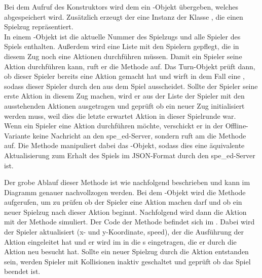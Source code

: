 Bei dem Aufruf des Konstruktors wird dem  ein -Objekt übergeben, welches abgespeichert
wird.
Zusätzlich erzeugt der  eine Instanz der Klasse , die einen Spielzug repräsentiert. \\

In einem -Objekt ist die aktuelle Nummer des Spielzugs und alle Spieler des Spiels enthalten.
Außerdem wird eine Liste mit den Spielern gepflegt, die in diesem Zug noch eine Aktionen durchführen müssen.
Damit ein Spieler seine Aktion durchführen kann, ruft er die Methode  auf.
Das Turn-Objekt prüft dann, ob dieser Spieler bereits eine Aktion gemacht hat und wirft in dem Fall eine
, sodass dieser Spieler durch den  aus dem Spiel ausscheidet.
Sollte der Spieler seine erste Aktion in diesem Zug machen, wird er aus der Liste der Spieler mit den ausstehenden
Aktionen ausgetragen und geprüft ob ein neuer Zug initialisiert werden muss, weil dies die letzte erwartet Aktion
in dieser Spielrunde war. \\

Wenn ein Spieler eine Aktion durchführen möchte, verschickt er in der Offline-Variante keine Nachricht an den spe\_ed-Server,
sondern ruft am  die Methode  auf.
Die Methode manipuliert dabei das -Objekt, sodass dies eine äquivalente Aktualisierung zum Erhalt des Spiels
im JSON-Format durch den spe\_ed-Server ist.

Der grobe Ablauf dieser Methode ist wie nachfolgend beschrieben und kann im Diagramm genauer nachvollzogen werden.
Bei dem -Objekt wird die Methode  aufgerufen, um zu prüfen ob der Spieler eine
Aktion machen darf und ob ein neuer Spielzug nach dieser Aktion beginnt.
Nachfolgend wird dann die Aktion mit der Methode 
simuliert.
Der Code der Methode befindet sich im .
Dabei wird der Spieler aktualisiert (x- und y-Koordinate, speed), der die Ausführung der Aktion eingeleitet hat und er
wird im  in die s eingetragen, die er durch die Aktion neu besucht hat.
Sollte ein neuer Spielzug durch die Aktion entstanden sein, werden Spieler mit Kollisionen inaktiv geschaltet und
geprüft ob das Spiel beendet ist. \\

